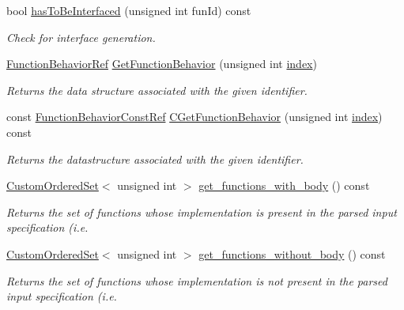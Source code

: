 \begin{DoxyCompactItemize}
bool \hyperlink{classapplication__manager_a7dd91f4c02d88ca6064d113520e6632c}{has\+To\+Be\+Interfaced} (unsigned int fun\+Id) const
\begin{DoxyCompactList}\small\item\em Check for interface generation. \end{DoxyCompactList}\item 
\hyperlink{function__behavior_8hpp_affbc6a46ab86ddfabe31c10986d333dc}{Function\+Behavior\+Ref} \hyperlink{classapplication__manager_ad6feddfe15eda18f0b886c465bc5add4}{Get\+Function\+Behavior} (unsigned int \hyperlink{tutorial__pact__2019_2Introduction_2third_2include_2Keccak_8h_a028c9bdc8344cca38ab522a337074797}{index})
\begin{DoxyCompactList}\small\item\em Returns the data structure associated with the given identifier. \end{DoxyCompactList}\item 
const \hyperlink{function__behavior_8hpp_a94872da12ed056b6ecf90456164e0213}{Function\+Behavior\+Const\+Ref} \hyperlink{classapplication__manager_ad201b883f3f2383c4c8256d9ba1177f1}{C\+Get\+Function\+Behavior} (unsigned int \hyperlink{tutorial__pact__2019_2Introduction_2third_2include_2Keccak_8h_a028c9bdc8344cca38ab522a337074797}{index}) const
\begin{DoxyCompactList}\small\item\em Returns the datastructure associated with the given identifier. \end{DoxyCompactList}\item 
\hyperlink{classCustomOrderedSet}{Custom\+Ordered\+Set}$<$ unsigned int $>$ \hyperlink{classapplication__manager_a8bb1664d61f349e809e4e2efee672457}{get\+\_\+functions\+\_\+with\+\_\+body} () const
\begin{DoxyCompactList}\small\item\em Returns the set of functions whose implementation is present in the parsed input specification (i.\+e. \end{DoxyCompactList}\item 
\hyperlink{classCustomOrderedSet}{Custom\+Ordered\+Set}$<$ unsigned int $>$ \hyperlink{classapplication__manager_af0f7db45a6ef1caffdffc644a03d8246}{get\+\_\+functions\+\_\+without\+\_\+body} () const
\begin{DoxyCompactList}\small\item\em Returns the set of functions whose implementation is not present in the parsed input specification (i.\+e. \end{DoxyCompactList}\item 

\end{DoxyCompactItemize}
